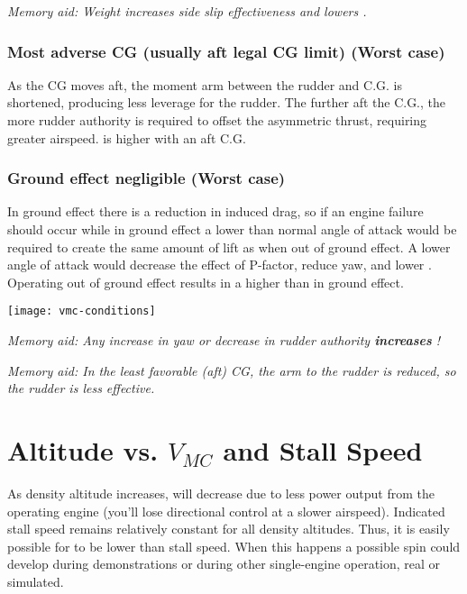 \emph{Memory aid: Weight increases side slip effectiveness and lowers \vmc.}

\subsubsection{Most adverse CG (usually aft legal CG limit) (Worst case)}

As the CG moves aft, the moment arm between the rudder and C.G. is shortened, producing less leverage for the
rudder. The further aft the C.G., the more rudder authority is required to offset the asymmetric thrust, requiring
greater airspeed. \vmc is higher with an aft C.G.

\subsubsection{Ground effect negligible (Worst case)}

In ground effect there is a reduction in induced drag, so if an engine failure should occur while in ground effect a
lower than normal angle of attack would be required to create the same amount of lift as when out of ground effect.
A lower angle of attack would decrease the effect of P-factor, reduce yaw, and lower \vmc. Operating out of ground
effect results in a higher \vmc than in ground effect.

\begin{center}
\texttt{[image: vmc-conditions]}
\end{center}

\emph{Memory aid: Any increase in yaw or decrease in rudder authority \textbf{increases} \vmc!}

\emph{Memory aid: In the least favorable (aft) CG, the arm to the rudder is reduced, so the rudder is less effective.}

\section{Altitude vs. $V_{MC}$ and Stall Speed}

As density altitude increases, \vmc will decrease due to less power output from the operating engine (you'll lose
directional control at a slower airspeed). Indicated stall speed remains relatively constant for all density altitudes.
Thus, it is easily possible for \vmc to be lower than stall speed. When this happens a possible spin could develop
during \vmc demonstrations or during other single-engine operation, real or simulated.

